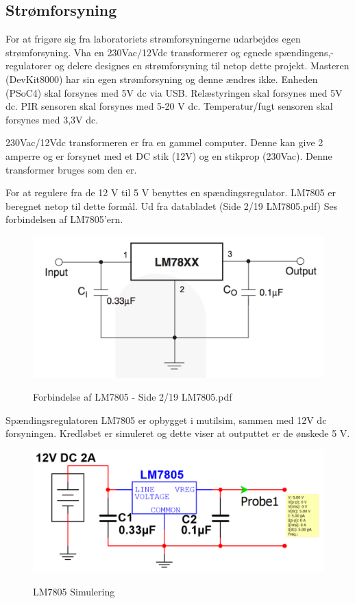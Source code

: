 \subsection{Strømforsyning}

For at frigøre sig fra laboratoriets strømforsyningerne udarbejdes egen strømforsyning. Vha en 230Vac/12Vdc transformerer og egnede spændingens,-regulatorer og delere designes en strømforsyning til netop dette projekt. Masteren (DevKit8000) har sin egen strømforsyning og denne ændres ikke. Enheden (PSoC4) skal forsynes med 5V dc via USB. Relæstyringen skal forsynes med 5V dc. PIR sensoren skal forsynes med 5-20 V dc. Temperatur/fugt sensoren skal forsynes med 3,3V dc. 

230Vac/12Vdc transformeren er fra en gammel computer. Denne kan give 2 amperre og er forsynet med et DC stik (12V) og en stikprop (230Vac). Denne transformer bruges som den er. 

For at regulere fra de 12 V til 5 V benyttes en spændingsregulator. LM7805 er beregnet netop til dette formål. Ud fra databladet (Side 2/19 LM7805.pdf) Ses forbindelsen af LM7805'ern.

\begin{figure}[H] \centering
{\includegraphics[width=\textwidth]{filer/design/Billeder/LM7805_DATASHEET}}
\caption{Forbindelse af LM7805 - Side 2/19 LM7805.pdf}
\label{lab:LM7805}
\raggedright
\end{figure}

Spændingsregulatoren LM7805 er opbygget i mutilsim, sammen med 12V dc forsyningen. Kredløbet er simuleret og dette viser at outputtet er de ønskede 5 V.

\begin{figure}[H] \centering
{\includegraphics[width=\textwidth]{filer/design/Billeder/LM7805_SIMULATION}}
\caption{LM7805 Simulering}
\label{lab:LM7805_SIMULERING}
\raggedright
\end{figure}

